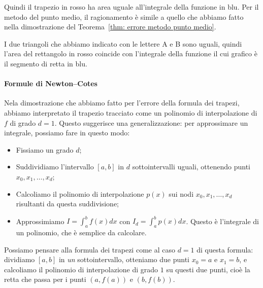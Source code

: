 \documentclass[a4paper]{report}
\theoremstyle{definiton}
\theoremstyle{remark}
\newcommand{\x}{\mathbf{x}}
\begin{document}
Quindi il trapezio in rosso ha area uguale all'integrale della funzione in blu. Per il metodo del punto medio, il ragionamento è simile a quello che abbiamo fatto nella dimostrazione del Teorema~\ref{thm: errore metodo punto medio}.
\begin{center}
    \end{center}
I due triangoli che abbiamo indicato con le lettere A e B sono uguali, quindi l'area del rettangolo in rosso coincide con l'integrale della funzione il cui grafico è il segmento di retta in blu.

\paragraph{Formule di Newton--Cotes} Nela dimostrazione che abbiamo fatto per l'errore della formula dei trapezi, abbiamo interpretato il trapezio tracciato come un polinomio di interpolazione di $f$ di grado $d=1$. Questo suggerisce una generalizzazione: per approssimare un integrale, possiamo fare in questo modo:
\begin{itemize}
    \item Fissiamo un grado $d$;
    \item Suddividiamo l'intervallo $[a,b]$ in $d$ sottointervalli uguali, ottenendo punti $x_0,x_1,\dots,x_d$;
    \item Calcoliamo il polinomio di interpolazione $p(x)$ sui nodi $x_0,x_1,\dots,x_d$ risultanti da questa suddivisione;
    \item Approssimiamo $I = \int_a^b f(x) dx$ con $I_d = \int_a^b p(x) dx$. Questo è l'integrale di un polinomio, che è semplice da calcolare.
\end{itemize}
Possiamo pensare alla formula dei trapezi come al caso $d=1$ di questa formula: dividiamo $[a,b]$ in \emph{un} sottointervallo, otteniamo due punti $x_0=a$ e $x_1=b$, e calcoliamo il polinomio di interpolazione di grado $1$ su questi due punti, cioè la retta che passa per i punti $(a,f(a))$ e $(b,f(b))$.
\end{document}
